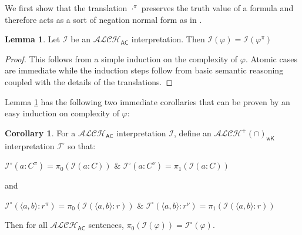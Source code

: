 \documentclass[letterpaper]{article} %
\theoremstyle{definition}
\newtheorem{lemma}{Lemma}
\theoremstyle{definition}
\theoremstyle{definition}
\theoremstyle{definition}
\theoremstyle{definition}
\newtheorem{corollary}[theorem]{Corollary}
\begin{document}






We first show that the translation $\cdot^{\pi}$ preserves the truth value of a formula and therefore acts as a sort of negation normal form as in \cite{DBLP:journals/logcom/Ferguson16}.

\begin{lemma}\label{lem:ALCH-AC-interpretations}
    Let $\mathcal{I}$ be an $\mathcal{ALCH}_{\mathsf{AC}}$ interpretation. Then $\mathcal{I}(\varphi)=\mathcal{I}(\varphi^{\pi})$
\end{lemma}

\begin{proof}
    This follows from a simple induction on the complexity of $\varphi$. Atomic cases are immediate while the induction steps follow from basic semantic reasoning coupled with the details of the translations. 
\end{proof}

\noindent Lemma \ref{lem:ALCH-AC-interpretations} has the following two immediate corollaries that can be proven by an easy induction on complexity of $\varphi$:

\begin{corollary}\label{cor:AC-to-wK}
    For a $\mathcal{ALCH}_{\mathsf{AC}}$ interpretation $\mathcal{I}$, define an $\mathcal{ALCH}^+(\cap)_{\mathsf{wK}}$ interpretation $\mathcal{I}^{\circ}$ so that:

    \begin{center}
   
        $\mathcal{I}^{\circ}(a:C^{\pi})=\pi_{0}(\mathcal{I}(a:C))$ \& $\mathcal{I}^{\circ}(a:C^{\nu})=\pi_{1}(\mathcal{I}(a:C))$
        
    \end{center}

    \noindent and

    \begin{center}
    
        $\mathcal{I}^{\circ}(\langle a,b\rangle:r^{\pi})=\pi_{0}(\mathcal{I}(\langle a,b\rangle:r))$ \& $\mathcal{I}^{\circ}(\langle a,b\rangle:r^{\nu})=\pi_{1}(\mathcal{I}(\langle a,b\rangle:r))$
        
    \end{center}

    \noindent Then for all $\mathcal{ALCH}_{\mathsf{AC}}$ sentences, $\pi_{0}(\mathcal{I}(\varphi))=\mathcal{I}^{\circ}(\varphi)$.
\end{corollary}
\end{document}
